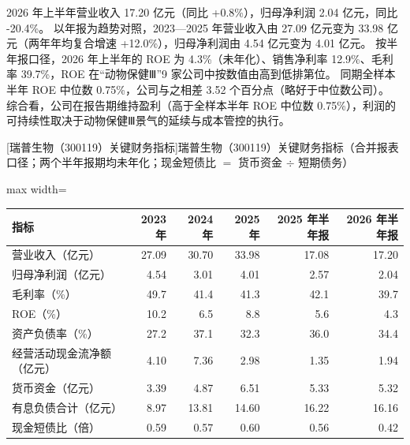  2026 年上半年营业收入 17.20 亿元（同比 +0.8\%），归母净利润 2.04 亿元，同比 -20.4\%。 以年报为趋势对照，2023---2025 年营业收入由 27.09 亿元变为 33.98 亿元（两年年均复合增速 +12.0\%），归母净利润由 4.54 亿元变为 4.01 亿元。 按半年报口径，2026 年上半年的 ROE 为 4.3\%（未年化）、销售净利率 12.9\%、毛利率 39.7\%，ROE 在“动物保健Ⅲ”9 家公司中按数值由高到低排第位。 同期全样本半年 ROE 中位数 0.75\%，公司与之相差 3.52 个百分点（略好于中位数公司）。 综合看，公司在报告期维持盈利（高于全样本半年 ROE 中位数 0.75\%），利润的可持续性取决于动物保健Ⅲ景气的延续与成本管控的执行。

\begin{center}\small\setlength{\tabcolsep}{3.4pt}
[瑞普生物（300119）关键财务指标]{瑞普生物（300119）关键财务指标（合并报表口径；两个半年报期均未年化；现金短债比 $=$ 货币资金 $\div$ 短期债务）}
\begin{adjustbox}{max width=\textwidth}
\begin{tabular}{@{}lrrrrr@{}}
\toprule
指标 & 2023 年 & 2024 年 & 2025 年 & 2025 年半年报 & 2026 年半年报 \\
\midrule
营业收入（亿元） & 27.09 & 30.70 & 33.98 & 17.08 & 17.20 \\
归母净利润（亿元） & 4.54 & 3.01 & 4.01 & 2.57 & 2.04 \\
毛利率（\%） & 49.7 & 41.4 & 41.3 & 42.1 & 39.7 \\
ROE（\%） & 10.2 & 6.5 & 8.8 & 5.6 & 4.3 \\
资产负债率（\%） & 27.2 & 37.1 & 32.3 & 36.0 & 34.4 \\
经营活动现金流净额（亿元） & 4.10 & 7.36 & 2.98 & 1.35 & 1.94 \\
货币资金（亿元） & 3.39 & 4.87 & 6.51 & 5.33 & 5.32 \\
有息负债合计（亿元） & 8.97 & 13.81 & 14.60 & 16.22 & 16.16 \\
现金短债比（倍） & 0.59 & 0.57 & 0.60 & 0.56 & 0.42 \\
\bottomrule
\end{tabular}
\end{adjustbox}
\end{center}

